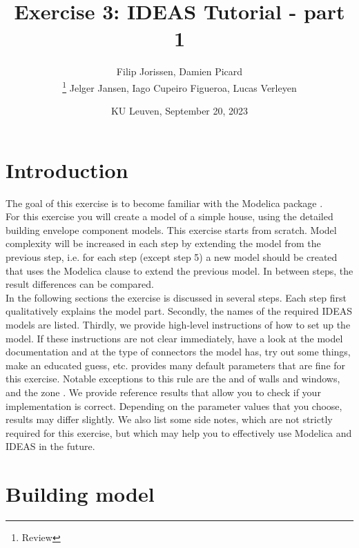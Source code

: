 \documentclass[10pt,a4paper]{article}
\begin{document}
\title{Exercise 3: IDEAS Tutorial - part 1}
\author{Filip Jorissen, Damien Picard\\ \thanks{Review}  Jelger Jansen, Iago Cupeiro Figueroa, Lucas Verleyen}
\date{KU Leuven, September 20, 2023}
\maketitle

\doclicenseThis

\section*{Introduction}
The goal of this exercise is to become familiar with the 
Modelica package . \\

For this exercise you will create a model of a simple house,
using the detailed building envelope component models.
This exercise starts from scratch. 
Model complexity will be increased in each step by 
extending the model from the previous step, i.e. for each step (except step 5) a new model should be created that uses
the Modelica  clause to extend the previous model.
In between steps, the result differences can be compared.\\


In the following sections the exercise is discussed 
in several steps. 
Each step first qualitatively explains the model part.
Secondly, the names of the required IDEAS models 
are listed.
Thirdly, we provide high-level instructions of how to
set up the model.
If these instructions are not clear immediately, 
have a look at the model documentation and at the type of
connectors the model has, 
try out some things, 
make an educated guess, etc.
 provides many default parameters that are fine for
this exercise. Notable exceptions to this rule are
the   and   of walls and windows, and the zone .
We provide reference results that allow you to check
if your implementation is correct. 
Depending on the parameter values that you choose, results
may differ slightly.
We also list some side notes, which are not strictly required for this
exercise, but which may help you to effectively use Modelica
and IDEAS in the future.

\newpage

\section{Building  model}
\end{document}
